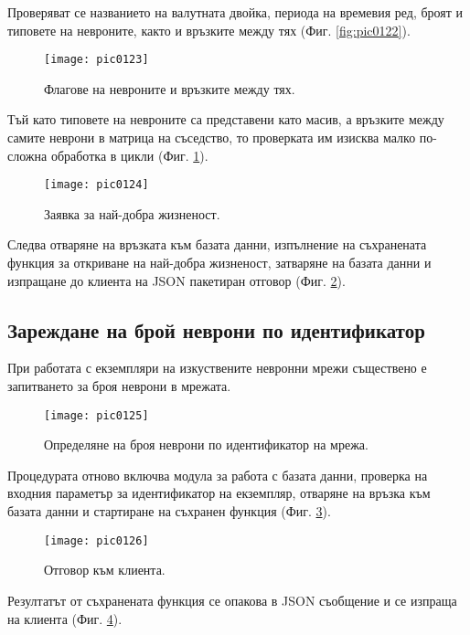 Проверяват се названието на валутната двойка, периода на времевия ред, броят и типовете на невроните, както и връзките между тях (Фиг. \ref{fig:pic0122}).

\begin{figure}[h]
  \centering
  \texttt{[image: pic0123]}
  \caption{Флагове на невроните и връзките между тях.}
\label{fig:pic0123}
\end{figure}
\FloatBarrier

Тъй като типовете на невроните са представени като масив, а връзките между самите неврони в матрица на съседство, то проверката им изисква малко по-сложна обработка в цикли (Фиг. \ref{fig:pic0123}).

\begin{figure}[h]
  \centering
  \texttt{[image: pic0124]}
  \caption{Заявка за най-добра жизненост.}
\label{fig:pic0124}
\end{figure}
\FloatBarrier

Следва отваряне на връзката към базата данни, изпълнение на съхранената функция за откриване на най-добра жизненост, затваряне на базата данни и изпращане до клиента на JSON пакетиран отговор (Фиг. \ref{fig:pic0124}).

\subsection{Зареждане на брой неврони по идентификатор}

При работата с екземпляри на изкуствените невронни мрежи съществено е запитването за броя неврони в мрежата. 

\begin{figure}[h]
  \centering
  \texttt{[image: pic0125]}
  \caption{Определяне на броя неврони по идентификатор на мрежа.}
\label{fig:pic0125}
\end{figure}
\FloatBarrier

Процедурата отново включва модула за работа с базата данни, проверка на входния параметър за идентификатор на екземпляр, отваряне на връзка към базата данни и стартиране на съхранен функция (Фиг. \ref{fig:pic0125}).

\begin{figure}[h]
  \centering
  \texttt{[image: pic0126]}
  \caption{Отговор към клиента.}
\label{fig:pic0126}
\end{figure}
\FloatBarrier

Резултатът от съхранената функция се опакова в JSON съобщение и се изпраща на клиента (Фиг. \ref{fig:pic0126}).


